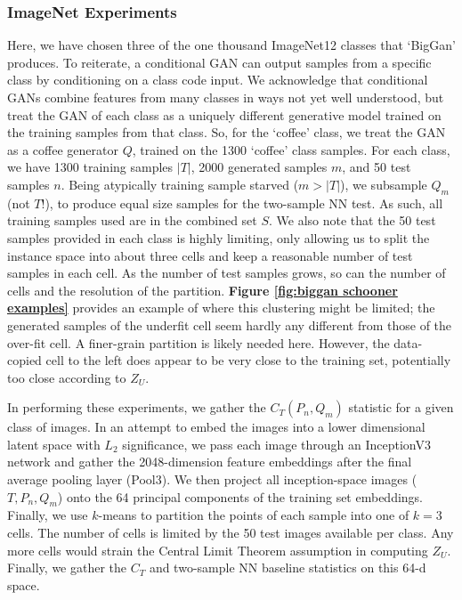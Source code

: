 \subsubsection{ImageNet Experiments}
\label{sec:appendix biggan experiments}
Here, we have chosen three of the one thousand ImageNet12 classes that `BigGan' produces. To reiterate, a conditional GAN can output samples from a specific class by conditioning on a class code input. We acknowledge that conditional GANs combine features from many classes in ways not yet well understood, but treat the GAN of each class as a uniquely different generative model trained on the training samples from that class. So, for the `coffee' class, we treat the GAN as a coffee generator $Q$, trained on the 1300 `coffee' class samples. For each class, we have 1300 training samples $|T|$, 2000 generated samples $m$, and 50 test samples $n$. Being atypically training sample starved ($m > |T|$), we subsample $Q_m$ (not $T$!), to produce equal size samples for the two-sample NN test. As such, all training samples used are in the combined set $S$. We also note that the 50 test samples provided in each class is highly limiting, only allowing us to split the instance space into about three cells and keep a reasonable number of test samples in each cell. As the number of test samples grows, so can the number of cells and the resolution of the partition. \textbf{Figure \ref{fig:biggan schooner examples}} provides an example of where this clustering might be limited; the generated samples of the underfit cell seem hardly any different from those of the over-fit cell. A finer-grain partition is likely needed here. However, the data-copied cell to the left does appear to be very close to the training set, potentially too close according to $Z_U$. 

In performing these experiments, we gather the $C_T(P_n, Q_m)$ statistic for a given class of images. In an attempt to embed the images into a lower dimensional latent space with $L_2$ significance, we pass each image through an InceptionV3 network and gather the 2048-dimension feature embeddings after the final average pooling layer (Pool3). We then project all inception-space images ($T, P_n, Q_m$) onto the 64 principal components of the training set embeddings. Finally, we use $k$-means to partition the points of each sample into one of $k = 3$ cells. The number of cells is limited by the 50 test images available per class. Any more cells would strain the Central Limit Theorem assumption in computing $Z_U$. Finally, we gather the $C_T$ and two-sample NN baseline statistics on this 64-d space. 

